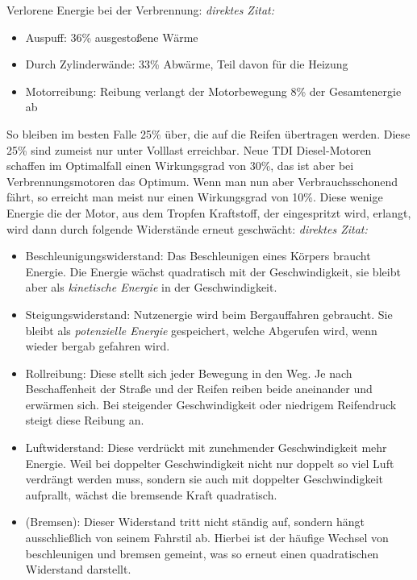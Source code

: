 Verlorene Energie bei der Verbrennung:
\textit{direktes Zitat: \cite{SIMR.CH1-Fahrstil-Analyse.Motorkennfeld}}
\begin{itemize}
	\item Auspuff: 36\% ausgestoßene Wärme
	\item Durch Zylinderwände: 33\% Abwärme, Teil davon für die Heizung
	\item Motorreibung: Reibung verlangt der Motorbewegung 8\% der Gesamtenergie ab
\end{itemize}
So bleiben im besten Falle 25\% über, die auf die Reifen übertragen werden. Diese 25\% sind zumeist nur unter Volllast erreichbar. Neue TDI Diesel-Motoren schaffen im Optimalfall einen Wirkungsgrad von 30\%, das ist aber bei Verbrennungsmotoren das Optimum. Wenn man nun aber Verbrauchsschonend fährt, so erreicht man meist nur einen Wirkungsgrad von 10\%. Diese wenige Energie die der Motor, aus dem Tropfen Kraftstoff, der eingespritzt wird, erlangt, wird dann durch folgende Widerstände erneut geschwächt:
\textit{direktes Zitat: \cite{SIMR.CH1-Fahrstil-Analyse.Motorkennfeld}}
\begin{itemize}
	\item Beschleunigungswiderstand: Das Beschleunigen eines Körpers braucht Energie. Die Energie wächst quadratisch mit der Geschwindigkeit, sie bleibt aber als \textit{kinetische Energie} in der Geschwindigkeit. 
	\item Steigungswiderstand: Nutzenergie wird beim Bergauffahren gebraucht. Sie bleibt als \textit{potenzielle Energie} gespeichert, welche Abgerufen wird, wenn wieder bergab gefahren wird.
	\item Rollreibung: Diese stellt sich jeder Bewegung in den Weg. Je nach Beschaffenheit der Straße und der Reifen reiben beide aneinander und erwärmen sich. Bei steigender Geschwindigkeit oder niedrigem Reifendruck steigt diese Reibung an.
	\item Luftwiderstand: Diese verdrückt mit zunehmender Geschwindigkeit mehr Energie. Weil bei doppelter Geschwindigkeit nicht nur doppelt so viel Luft verdrängt werden muss, sondern sie auch mit doppelter Geschwindigkeit aufprallt, wächst die bremsende Kraft quadratisch. 
	\item (Bremsen): Dieser Widerstand tritt nicht ständig auf, sondern hängt ausschließlich von seinem Fahrstil ab. Hierbei ist der häufige Wechsel von beschleunigen und bremsen gemeint, was so erneut einen quadratischen Widerstand darstellt. 
\end{itemize}

